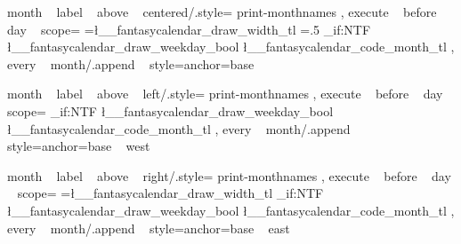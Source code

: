 \tikzset
  {
    month ~ label ~ above ~ centered/.style=
      {
        print-monthnames ,
        execute ~ before ~ day ~ scope=
          {
              {
                {
                  \pgf@xb=\l__fantasycalendar_draw_width_tl\pgf@xa%
                  \pgf@xb=.5\pgf@xb%
                  \pgftransformxshift{\pgf@xb}
                  \bool_if:NTF \l__fantasycalendar_draw_weekday_bool
                    {  }
                    {  }
                  \l__fantasycalendar_code_month_tl
                }
              } 
          }
        ,
        every ~ month/.append ~ style={anchor=base}
      }
  }

\tikzset
  {
    month ~ label ~ above ~ left/.style=
      {
        print-monthnames ,
        execute ~ before ~ day ~ scope=
          {
              {
                {
                  \bool_if:NTF \l__fantasycalendar_draw_weekday_bool
                    {  }
                    {  }
                  \l__fantasycalendar_code_month_tl%
                }
              } 
          }
        ,
        every ~ month/.append ~ style={anchor=base ~ west}
      }
  }



\tikzset
  {
    month ~ label ~ above ~ right/.style=
      {
        print-monthnames ,
        execute ~ before ~ day ~ scope=
          {
              {
                {
                  \pgf@xb=\l__fantasycalendar_draw_width_tl\pgf@xa%
                  \pgftransformxshift{\pgf@xb}
                  \bool_if:NTF \l__fantasycalendar_draw_weekday_bool
                    {  }
                    {  }
                  \l__fantasycalendar_code_month_tl%
                }
              } 
          }
        ,
        every ~ month/.append ~ style={anchor=base ~ east}
      }
  }

